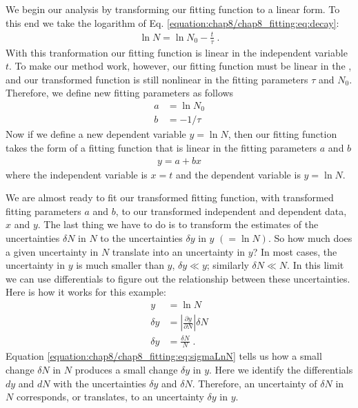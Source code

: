 \documentclass[letterpaper,10pt,english]{sphinxmanual}
\begin{document}
\sphinxAtStartPar
We begin our analysis by transforming our fitting function to a linear form.  To this end we take the logarithm of Eq. \eqref{equation:chap8/chap8_fitting:eq:decay}:
\begin{equation*}
\begin{split}\ln N = \ln N_{0} -\frac{t}{\tau} \;.\end{split}
\end{equation*}
\sphinxAtStartPar
With this tranformation our fitting function is linear in the independent variable \(t\).  To make our method work, however, our fitting function must be linear in the , and our transformed function is still nonlinear in the fitting parameters \(\tau\) and \(N_0\).  Therefore, we define new fitting parameters as follows
\begin{equation}\label{equation:chap8/chap8_fitting:eq:eq15}
\begin{split}a &= \ln N_{0}\\
b &= -1/\tau\end{split}
\end{equation}
\sphinxAtStartPar
Now if we define a new dependent variable \(y = \ln N\), then our fitting function takes the form of a fitting function that is linear in the fitting parameters \(a\) and \(b\)
\begin{equation*}
\begin{split}y = a + bx\end{split}
\end{equation*}
\sphinxAtStartPar
where the independent variable is \(x=t\) and the dependent variable is \(y=\ln N\).

\sphinxAtStartPar
We are almost ready to fit our transformed fitting function, with transformed fitting parameters \(a\) and \(b\), to our transformed independent and dependent data, \(x\) and \(y\).  The last thing we have to do is to transform the estimates of the uncertainties \(\delta N\) in \(N\) to the uncertainties \(\delta y\) in \(y\) \((= \ln N)\).  So how much does a given uncertainty in \(N\) translate into an uncertainty in \(y\)?  In most cases, the uncertainty in \(y\) is much smaller than \(y\),  \(\delta y \ll y\); similarly \(\delta N \ll N\).  In this limit we can use differentials to figure out the relationship between these uncertainties.  Here is how it works for this example:
\begin{equation}\label{equation:chap8/chap8_fitting:eq:sigmaLnN}
\begin{split}y &= \ln N\\
\delta y &= \left|\frac{\partial y}{\partial N}\right|\delta N\\
\delta y &= \frac{\delta N} {N} \;.\end{split}
\end{equation}
\sphinxAtStartPar
Equation \eqref{equation:chap8/chap8_fitting:eq:sigmaLnN} tells us how a small change \(\delta N\) in \(N\) produces a small change \(\delta y\) in \(y\).  Here we identify the differentials \(dy\) and \(dN\) with the uncertainties \(\delta y\) and \(\delta N\).  Therefore, an uncertainty of \(\delta N\) in \(N\) corresponds, or translates, to an uncertainty \(\delta y\) in \(y\).
\end{document}
